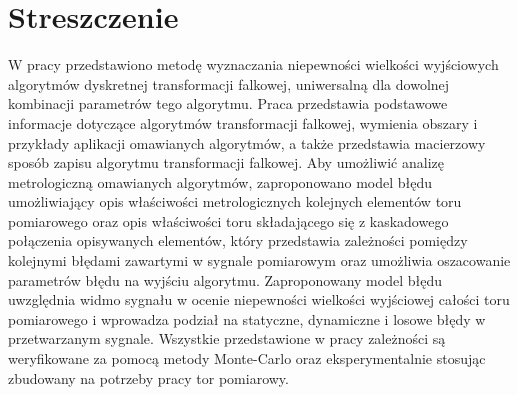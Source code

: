 \chapter*{Streszczenie}

W pracy przedstawiono metodę wyznaczania niepewności wielkości wyjściowych algorytmów dyskretnej transformacji falkowej, uniwersalną dla dowolnej kombinacji parametrów tego algorytmu. Praca przedstawia podstawowe informacje dotyczące algorytmów transformacji falkowej, wymienia obszary i przykłady aplikacji omawianych algorytmów, a także przedstawia macierzowy sposób zapisu algorytmu transformacji falkowej. Aby umożliwić analizę metrologiczną omawianych algorytmów,  zaproponowano model błędu umożliwiający opis właściwości metrologicznych kolejnych elementów toru pomiarowego oraz opis właściwości toru składającego się z kaskadowego połączenia opisywanych elementów, który przedstawia zależności pomiędzy kolejnymi błędami zawartymi w sygnale pomiarowym oraz umożliwia oszacowanie parametrów błędu na wyjściu algorytmu. Zaproponowany model błędu uwzględnia widmo sygnału w ocenie niepewności wielkości wyjściowej całości toru pomiarowego i wprowadza podział na statyczne, dynamiczne i losowe błędy w przetwarzanym sygnale. Wszystkie przedstawione w pracy zależności są weryfikowane za pomocą metody Monte-Carlo oraz eksperymentalnie stosując zbudowany na potrzeby pracy tor pomiarowy.

